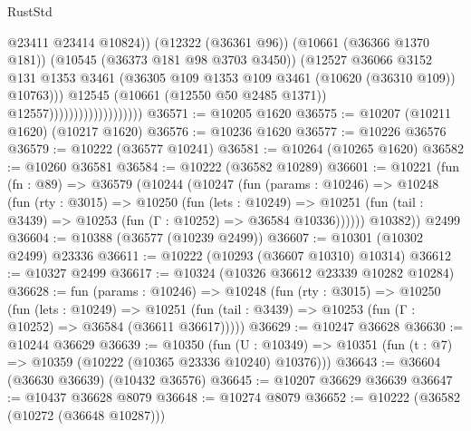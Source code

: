 \begin{lexlean}{RustStd}
\begin{coremodule}
                                                @23411
                                                @23414
                                                @10824))
                                            (@12322 (@36361 @96))
                                            (@10661 (@36366 @1370 @181))
                                            (@10545 (@36373 @181 @98 @3703 @3450))
                                            (@12527
                                              @36066
                                              @3152
                                              @131
                                              @1353
                                              @3461
                                              (@36305
                                                @109
                                                @1353
                                                @109
                                                @3461
                                                (@10620 (@36310 @109))
                                                @10763)))
                                          @12545
                                          (@10661 (@12550 @50 @2485 @1371))
                                          @12557)))))))))))))))))))
@36571 := @10205 @1620
@36575 := @10207 (@10211 @1620) (@10217 @1620)
@36576 := @10236 @1620
@36577 := @10226 @36576
@36579 := @10222 (@36577 @10241)
@36581 := @10264 (@10265 @1620)
@36582 := @10260 @36581
@36584 := @10222 (@36582 @10289)
@36601 := @10221
    (fun (fn : @89) =>
    @36579
      (@10244
        (@10247
          (fun (params : @10246) =>
          @10248
            (fun (rty : @3015) =>
            @10250
              (fun (lets : @10249) =>
              @10251 (fun (tail : @3439) => @10253 (fun (Γ : @10252) => @36584 @10336))))))
        @10382))
    @2499
@36604 := @10388 (@36577 (@10239 @2499))
@36607 := @10301 (@10302 @2499) @23336
@36611 := @10222 (@10293 (@36607 @10310) @10314)
@36612 := @10327 @2499
@36617 := @10324 (@10326 @36612 @23339 @10282 @10284)
@36628 := fun (params : @10246) =>
  @10248
    (fun (rty : @3015) =>
    @10250
      (fun (lets : @10249) =>
      @10251 (fun (tail : @3439) => @10253 (fun (Γ : @10252) => @36584 (@36611 @36617)))))
@36629 := @10247 @36628
@36630 := @10244 @36629
@36639 := @10350
    (fun (U : @10349) => @10351 (fun (t : @7) => @10359 (@10222 (@10365 @23336 @10240) @10376)))
@36643 := @36604 (@36630 @36639) (@10432 @36576)
@36645 := @10207 @36629 @36639
@36647 := @10437 @36628 @8079
@36648 := @10274 @8079
@36652 := @10222 (@36582 (@10272 (@36648 @10287)))

\end{coremodule}
\end{lexlean}
